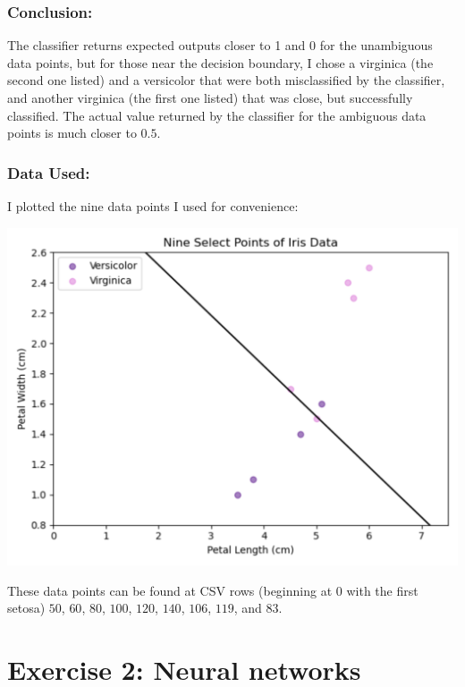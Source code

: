 \documentclass{article} %
\begin{document}
\subsubsection*{Conclusion: }
The classifier returns expected outputs closer to 1 and 0 for the unambiguous data points, but for those near the decision boundary, I chose a virginica (the second one listed) and a versicolor that were both misclassified by the classifier, and another virginica (the first one listed) that was close, but successfully classified.  The actual value returned by the classifier for the ambiguous data points is much closer to $0.5$.
\subsubsection*{Data Used: }
I plotted the nine data points I used for convenience:
\begin{center}
    \includegraphics[scale=0.40]{1e_plot.png}
\end{center}
These data points can be found at CSV rows (beginning at $0$ with the first setosa) $50$, $60$, $80$, $100$, $120$, $140$, $106$, $119$, and $83$.
\section*{Exercise 2: Neural networks}
\end{document}
